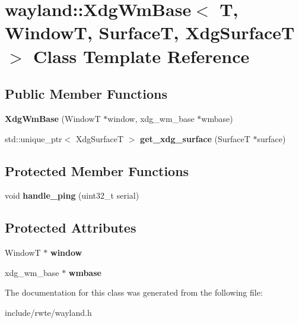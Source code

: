 \hypertarget{classwayland_1_1XdgWmBase}{}\section{wayland\+::Xdg\+Wm\+Base$<$ T, WindowT, SurfaceT, Xdg\+SurfaceT $>$ Class Template Reference}
\label{classwayland_1_1XdgWmBase}
\subsection*{Public Member Functions}
\begin{DoxyCompactItemize}
\item 
\mbox{\label{classwayland_1_1XdgWmBase_a9bd3fe54d6d1083c80ef459a02fcda10}} 
{\bfseries Xdg\+Wm\+Base} (WindowT $\ast$window, xdg\+\_\+wm\+\_\+base $\ast$wmbase)
\item 
\mbox{\label{classwayland_1_1XdgWmBase_a0824bb3dc12d56cd1e385dd3800c4cec}} 
std\+::unique\+\_\+ptr$<$ Xdg\+SurfaceT $>$ {\bfseries get\+\_\+xdg\+\_\+surface} (SurfaceT $\ast$surface)
\end{DoxyCompactItemize}
\subsection*{Protected Member Functions}
\begin{DoxyCompactItemize}
\item 
\mbox{\label{classwayland_1_1XdgWmBase_a95aa1abd58b05dbc5b86f8d86985bcb9}} 
void {\bfseries handle\+\_\+ping} (uint32\+\_\+t serial)
\end{DoxyCompactItemize}
\subsection*{Protected Attributes}
\begin{DoxyCompactItemize}
\item 
\mbox{\label{classwayland_1_1XdgWmBase_a3ade88e0d3a8dbd38fd73e705ab76a9c}} 
WindowT $\ast$ {\bfseries window}
\item 
\mbox{\label{classwayland_1_1XdgWmBase_ada309aa1d7cc44e95d3cea8f30720679}} 
xdg\+\_\+wm\+\_\+base $\ast$ {\bfseries wmbase}
\end{DoxyCompactItemize}


The documentation for this class was generated from the following file\+:\begin{DoxyCompactItemize}
\item 
include/rwte/wayland.\+h\end{DoxyCompactItemize}
